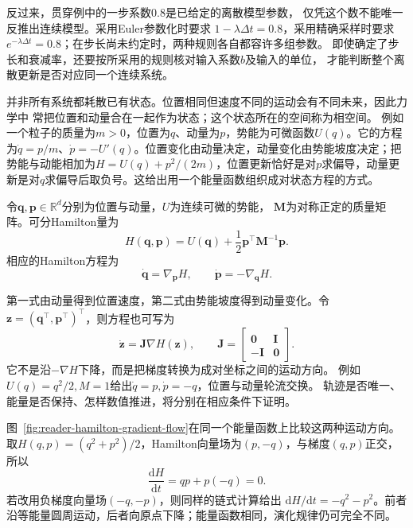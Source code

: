 反过来，贯穿例中的一步系数$0.8$是已给定的离散模型参数，
仅凭这个数不能唯一反推出连续模型。采用Euler参数化时要求
\(1-\lambda\Delta t=0.8\)，采用精确采样时要求
\(e^{-\lambda\Delta t}=0.8\)；在步长尚未约定时，两种规则各自都容许多组参数。
即使确定了步长和衰减率，还要按所采用的规则核对输入系数\(b\)及输入的单位，
才能判断整个离散更新是否对应同一个连续系统。

并非所有系统都耗散已有状态。位置相同但速度不同的运动会有不同未来，因此力学中
常把位置和动量合在一起作为状态；这个状态所在的空间称为相空间。
例如一个粒子的质量为\(m>0\)，位置为\(q\)、动量为\(p\)，势能为可微函数\(U(q)\)。它的方程为\(\dot q=p/m\)、\(\dot p=-U'(q)\)。位置变化由动量决定，动量变化由势能坡度决定；把势能与动能相加为\(H=U(q)+p^2/(2m)\)，位置更新恰好是对\(p\)求偏导，动量更新是对\(q\)求偏导后取负号。这给出用一个能量函数组织成对状态方程的方式。
\begin{definition}[可分Hamilton系统]
  \label{def:dynamical-separable-hamiltonian-system}
  令$\bm q,\bm p\in\mathbb R^d$分别为位置与动量，$U$为连续可微的势能，
  $\bm M$为对称正定的质量矩阵。可分Hamilton量为
  \begin{equation}
    H(\bm q,\bm p)=U(\bm q)+\frac12\bm p^\top\bm M^{-1}\bm p.
    \label{eq:dynamical-separable-hamiltonian}
  \end{equation}
  相应的Hamilton方程为
  \begin{equation}
    \dot{\bm q}=\nabla_{\bm p}H,\qquad
    \dot{\bm p}=-\nabla_{\bm q}H.
    \label{eq:dynamical-hamilton-equations}
  \end{equation}
\end{definition}
第一式由动量得到位置速度，第二式由势能坡度得到动量变化。令
$\bm z=(\bm q^\top,\bm p^\top)^\top$，则方程也可写为
\[
  \dot{\bm z}=\bm J\nabla H(\bm z),\qquad
  \bm J=\begin{bmatrix}\bm0&\bm I\\-\bm I&\bm0\end{bmatrix}.
\]
它不是沿$-\nabla H$下降，而是把梯度转换为成对坐标之间的运动方向。
例如$U(q)=q^2/2,M=1$给出$\dot q=p,\dot p=-q$，位置与动量轮流交换。
轨迹是否唯一、能量是否保持、怎样数值推进，将分别在相应条件下证明。

图~\ref{fig:reader-hamilton-gradient-flow}在同一个能量函数上比较这两种运动方向。取$H(q,p)=(q^2+p^2)/2$，Hamilton向量场为$(p,-q)$，与梯度$(q,p)$正交，所以
\[
  \frac{\mathrm dH}{\mathrm dt}=qp+p(-q)=0.
\]
若改用负梯度向量场$(-q,-p)$，则同样的链式计算给出
$\mathrm dH/\mathrm dt=-q^2-p^2$。前者沿等能量圆周运动，后者向原点下降；能量函数相同，演化规律仍可完全不同。

